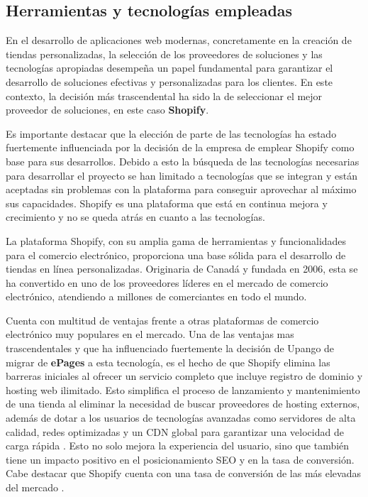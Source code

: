 \documentclass[11pt]{article}
\begin{document}
\subsection{Herramientas y tecnologías empleadas}
En el desarrollo de aplicaciones web modernas, concretamente en la creación de tiendas personalizadas, la selección de los proveedores de soluciones
y las tecnologías apropiadas desempeña un papel fundamental para garantizar el desarrollo de soluciones efectivas y personalizadas para los clientes.
En este contexto, la decisión más trascendental ha sido la de seleccionar el mejor proveedor de soluciones, en este caso \textbf{Shopify}.

Es importante destacar que la elección de parte de las tecnologías ha estado fuertemente influenciada por la decisión de la empresa de emplear Shopify
como base para sus desarrollos. Debido a esto la búsqueda de las tecnologías necesarias para desarrollar el proyecto se han limitado a
tecnologías que se integran y están aceptadas sin problemas con la plataforma para conseguir aprovechar al máximo sus capacidades. Shopify es una plataforma que está en continua mejora y crecimiento y no se queda atrás en cuanto a las tecnologías.

La plataforma Shopify, con su amplia gama de herramientas y funcionalidades para el comercio electrónico, 
proporciona una base sólida para el desarrollo de tiendas en línea personalizadas. Originaria de Canadá y 
fundada en 2006, esta se ha convertido en uno de los proveedores líderes en el mercado de comercio electrónico, 
atendiendo a millones de comerciantes en todo el mundo. 

Cuenta con multitud de ventajas frente a otras plataformas de comercio electrónico muy populares en el mercado. Una de las ventajas
mas trascendentales y que ha influenciado fuertemente  la decisión de Upango de migrar de \textbf{ePages} a esta tecnología, es el hecho de que Shopify elimina
las barreras iniciales al ofrecer un servicio completo que incluye registro de dominio y hosting web ilimitado. Esto simplifica el proceso de lanzamiento y mantenimiento
de una tienda al eliminar la necesidad de buscar proveedores de hosting externos, además de dotar a los usuarios de tecnologías avanzadas como servidores de alta
calidad, redes optimizadas y un CDN global para garantizar una velocidad de carga rápida \cite{shopify-tutorial}. Esto no solo mejora la experiencia del usuario, sino que también 
tiene un impacto positivo en el posicionamiento SEO y en la tasa de conversión. Cabe destacar que Shopify cuenta con una tasa de conversión de las más
elevadas del mercado \cite{shopify-tasa-conversion}. 
\end{document}
